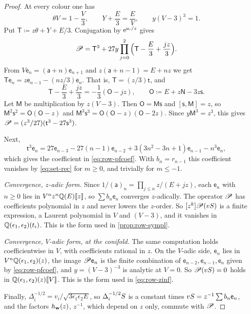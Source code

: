 \begin{proof}
At every colour one has
\[
\theta V=1-\frac V3,\qquad Y+\frac E3=\frac EV,\qquad y(V-3)^3=1.
\]
Put $\mathsf{T}\coloneqq z\theta+Y+E/3$. Conjugation by $\mathrm{e}^{\mathsf{u}_i/z}$ gives
\[
\mathscr{P}=\mathsf{T}^3+27y\prod_{j=0}^{2}\Big(\mathsf{T}-\frac E3+\frac{jz}{3}\Big).
\]
From $V\mathsf{e}_n=(\mathsf{a}+n)\mathsf{e}_{n+1}$ and $z(\mathsf{a}+n-1)=E+nz$ we get $\mathsf{T}\mathsf{e}_n=z\mathsf{e}_{n-1}-(nz/3)\mathsf{e}_n$. That is, $\mathsf{T}=(z/3)\mathsf{t}$, and
\[
\mathsf{T}-\frac E3+\frac{jz}3=-\frac13(\mathsf{O}-jz),\qquad\mathsf{O}\coloneqq E+z\mathsf{N}-3z\mathsf{s}.
\]
Let $\mathsf{M}$ be multiplication by $z(V-3)$. Then $\mathsf{O}=\mathsf{M}\mathsf{s}$ and $[\mathsf{s},\mathsf{M}]=z$, so $\mathsf{M}^2\mathsf{s}^2=\mathsf{O}(\mathsf{O}-z)$ and $\mathsf{M}^3\mathsf{s}^3=\mathsf{O}(\mathsf{O}-z)(\mathsf{O}-2z)$. Since $y\mathsf{M}^3=z^3$, this gives $\mathscr{P}=(z^3/27)(\mathsf{t}^3-27\mathsf{s}^3)$.

Next,
\[
\mathsf{t}^3\mathsf{e}_n=27\mathsf{e}_{n-3}-27(n-1)\mathsf{e}_{n-2}+3(3n^2-3n+1)\mathsf{e}_{n-1}-n^3\mathsf{e}_n,
\]
which gives the coefficient in \eqref{eq:row-pfcoef}. With $b_n=r_{n-1}$ this coefficient vanishes by \eqref{eq:set-rec} for $m\geq0$, and trivially for $m\leq-1$.

\emph{Convergence, $z$-adic form.} Since $1/(\mathsf{a})_n=\prod_{j\leq n}z/(E+jz)$, each $\mathsf{e}_n$ with $n\geq0$ lies in $V^nz^n\mathbb{Q}(E)[\![ z ]\!]$, so $\sum b_n\mathsf{e}_n$ converges $z$-adically. The operator $\mathscr{P}$ has coefficients polynomial in $z$ and never lowers the $z$-order. So $[z^k]\mathscr{P}(vS)$ is a finite expression, a Laurent polynomial in $V$ and $(V-3)$, and it vanishes in $\mathbb{Q}(\epsilon_1,\epsilon_2)(t_i)$. This is the form used in \cref{prop:row-sympl}.

\emph{Convergence, $V$-adic form, at the conifold.} The same computation holds coefficientwise in $V$, with coefficients rational in $z$. On the $V$-adic side, $\mathsf{e}_n$ lies in $V^n\mathbb{Q}(\epsilon_1,\epsilon_2)(z)$, the image $\mathscr{P}\mathsf{e}_n$ is the finite combination of $\mathsf{e}_{n-2},\mathsf{e}_{n-1},\mathsf{e}_n$ given by \eqref{eq:row-pfcoef}, and $y=(V-3)^{-3}$ is analytic at $V=0$. So $\mathscr{P}(vS)=0$ holds in $\mathbb{Q}(\epsilon_1,\epsilon_2)(z)[\![ V ]\!]$. This is the form used in \eqref{eq:row-zinf}.

Finally, $\Delta_i^{-1/2}=v_i/\sqrt{3\epsilon_1\epsilon_2E}$, so $\Delta_i^{-1/2}S$ is a constant times $vS=z^{-1}\sum b_n\mathsf{e}_n$, and the factors $h_{\mathbf{w}}(z)$, $z^{-1}$, which depend on $z$ only, commute with $\mathscr{P}$.
\end{proof}

